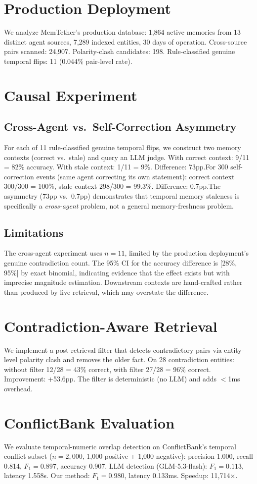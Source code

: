 \documentclass{article}
\begin{document}
\section{Production Deployment}We analyze MemTether's production database: 1{,}864 active memories from 13 distinct agent sources, 7{,}289 indexed entities, 30 days of operation. Cross-source pairs scanned: 24{,}907. Polarity-clash candidates: 198. Rule-classified genuine temporal flips: 11 (0.044\% pair-level rate).
\section{Causal Experiment}\subsection{Cross-Agent vs.\ Self-Correction Asymmetry}For each of 11 rule-classified genuine temporal flips, we construct two memory contexts (correct vs.\ stale) and query an LLM judge. With correct context: 9/11 = 82\% accuracy. With stale context: 1/11 = 9\%. Difference: 73pp.For 300 self-correction events (same agent correcting its own statement): correct context 300/300 = 100\%, stale context 298/300 = 99.3\%. Difference: 0.7pp.The asymmetry (73pp vs.\ 0.7pp) demonstrates that temporal memory staleness is specifically a \emph{cross-agent} problem, not a general memory-freshness problem.\subsection{Limitations}The cross-agent experiment uses $n{=}11$, limited by the production deployment's genuine contradiction count. The 95\% CI for the accuracy difference is [28\%, 95\%] by exact binomial, indicating evidence that the effect exists but with imprecise magnitude estimation. Downstream contexts are hand-crafted rather than produced by live retrieval, which may overstate the difference.
\section{Contradiction-Aware Retrieval}We implement a post-retrieval filter that detects contradictory pairs via entity-level polarity clash and removes the older fact. On 28 contradiction entities: without filter 12/28 = 43\% correct, with filter 27/28 = 96\% correct. Improvement: +53.6pp. The filter is deterministic (no LLM) and adds $<$1ms overhead.
\section{ConflictBank Evaluation}We evaluate temporal-numeric overlap detection on ConflictBank's temporal conflict subset ($n{=}2{,}000$, 1{,}000 positive + 1{,}000 negative): precision 1.000, recall 0.814, $F_1{=}0.897$, accuracy 0.907. LLM detection (GLM-5.3-flash): $F_1{=}0.113$, latency 1.558s. Our method: $F_1{=}0.980$, latency 0.133ms. Speedup: 11{,}714$\times$.
\end{document}

